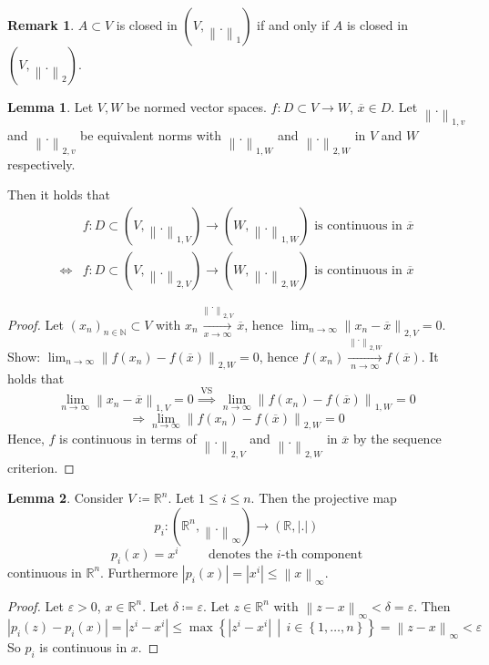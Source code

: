 \documentclass[a4paper,landscape,twocolumn]{article}
\theoremstyle{definition}
\newtheorem{rem}{Remark}
\newtheorem{lemma}{Lemma}
\newcommand\set[1]{\left\{#1\right\}}
\newcommand\setdef[2]{\left\{#1\,\middle|\,#2\right\}}
\newcommand\abs[1]{\left|#1\right|}
\newcommand\norm[1]{\left\|#1\right\|}
\newcommand\inorm[1]{\left\|#1\right\|_\infty}
\begin{document}
\begin{rem}
  $A \subset V$ is closed in $(V, \norm{.}_1)$ if and only if $A$ is closed
  in $(V, \norm{.}_2)$.
\end{rem}
\begin{lemma}
  Let $V, W$ be normed vector spaces. $f: D \subset V \to W$, $\overline x \in D$. Let $\norm{.}_{1,v}$ and $\norm{.}_{2,v}$ be equivalent norms with $\norm{.}_{1,W}$ and $\norm{.}_{2,W}$ in $V$ and $W$ respectively.

  Then it holds that
  \begin{align*}
         & f: D \subset (V, \norm{.}_{1,V}) \to (W, \norm{.}_{1,W}) \text{ is continuous in } \overline{x} \\
    \iff & f: D \subset (V, \norm{.}_{2,V}) \to (W, \norm{.}_{2,W}) \text{ is continuous in } \overline{x}
  \end{align*}
\end{lemma}
\begin{proof}
  Let $(x_n)_{n\in\mathbb N} \subset V$ with $x_n \underset{x\to\infty}{\overset{\norm{.}_{2,V}}{\longrightarrow}} \overline{x}$, hence $\lim_{n\to\infty} \norm{x_n - \overline{x}}_{2,V} = 0$.
  Show: $\lim_{n\to\infty} \norm{f(x_n) - f(\overline{x})}_{2,W} = 0$, hence $f(x_n) \overset{\norm{.}_{2,W}}{\underset{n\to\infty}{\longrightarrow}} f(\overline{x})$.
  It holds that
  \[ \lim_{n\to\infty} \norm{x_n - \overline{x}}_{1,V} = 0 \overset{\text{VS}}{\implies} \lim_{n\to\infty} \norm{f(x_n) - f(\overline{x})}_{1,W} = 0 \]
  \[ \Rightarrow \lim_{n\to\infty} \norm{f(x_n) - f(\overline{x})}_{2,W} = 0 \]
  Hence, $f$ is continuous in terms of $\norm{.}_{2,V}$ and $\norm{.}_{2,W}$ in $\overline{x}$ by the sequence criterion.
\end{proof}

\begin{lemma}
  Consider $V \coloneqq \mathbb R^n$.
  Let $1 \leq i \leq n$. Then the projective map
  \[ p_i: (\mathbb R^n, \inorm{.}) \to (\mathbb R, \abs{.}) \]
  \[ p_i(x) = x^i \qquad \text{ denotes the $i$-th component} \]
  continuous in $\mathbb R^n$. Furthermore $\abs{p_i(x)} = \abs{x^i} \leq \inorm{x}$.
\end{lemma}

\begin{proof}
  Let $\varepsilon > 0$, $x \in \mathbb R^n$. Let $\delta \coloneqq \varepsilon$.
  Let $z \in \mathbb R^n$ with $\inorm{z - x} < \delta = \varepsilon$.
  Then
  \[ \abs{p_i(z) - p_i(x)} = \abs{z^i - x^i} \leq \max\setdef{\abs{z^i - x^i}}{i \in \set{1, \ldots, n}} = \inorm{z - x} < \varepsilon \]
  So $p_i$ is continuous in $x$.
\end{proof}
\end{document}
